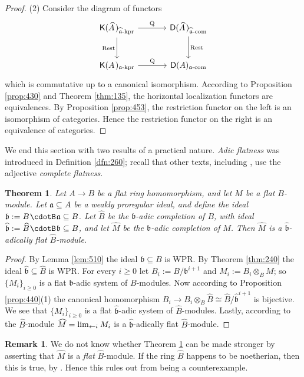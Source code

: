 \documentclass[10pt]{amsart}
\newtheorem{thm}[equation]{Theorem}
\theoremstyle{definition}
\newtheorem{rem}[equation]{Remark}
\numberwithin{equation}{section}
\newcommand{\lto}{\leftarrow}
\newcommand{\sub}{\subseteq}
\newcommand{\opn}{\operatorname}
\newcommand{\cat}[1]{\operatorname{\mathsf{#1}}}
\newcommand{\cd}{\mspace{1.3mu}{\cdotB}\mspace{1.3mu}}
\newcommand{\mfrak}[1]{\mathfrak{#1}}
\newcommand{\mrm}[1]{\mathrm{#1}}
\renewcommand{\a}{\mfrak{a}}
\renewcommand{\b}{\mfrak{b}}
\newcommand{\tup}[1]{\textrm{#1}}
\newcommand{\ot}{\otimes}
\newcommand{\what}[1]{\widehat{#1}}
\newcommand{\wh}[1]{\widehat{#1}}
\newcommand{\msp}[1]{\mspace{#1 mu}}
\begin{document}
\begin{proof}
\medskip \noindent
(2) Consider the diagram of functors
\[ \begin{tikzcd} [column sep = 8ex, row sep = 6ex]
\cat{K}(\what{A} \msp{2})_{\tup{$\what{\a}$-kpr}}
\ar[d, "{\opn{Rest}}"']
\ar[r, "{\mrm{Q}}"]
&
\cat{D}(\what{A} \msp{2})_{\tup{$\what{\a}$-com}}
\ar[d, "{\opn{Rest}}"]
\\
\cat{K}(A \msp{2})_{\tup{$\a$-kpr}}
\ar[r, "{\mrm{Q}}"]
&
\cat{D}(A)_{\tup{$\a$-com}}
\end{tikzcd} \]
which is commutative up to a canonical isomorphism.
According to Proposition \ref{prop:430} and Theorem \ref{thm:135}, the
horizontal localization functors are equivalences. By Proposition
\ref{prop:453}, the restriction functor on the left is an isomorphism of
categories. Hence the restriction functor on the right is an equivalence of
categories.
\end{proof}

We end this section with two results of a practical nature.
{\em Adic flatness} was introduced in Definition \ref{dfn:260}; recall
that other texts, including \cite{BS}, use the adjective {\em complete
flatness}.

\begin{thm} \label{thm:510}
Let $A \to B$ be a flat ring homomorphism, and let $M$ be a flat $B$-module.
Let $\a \sub A$ be a weakly proregular ideal, and define the ideal
$\b := B \cd \a \sub B$. Let $\wh{B}$ be the $\b$-adic completion of $B$, with
ideal $\wh{\b} := \wh{B} \cd \b \sub B$, and let
$\wh{M}$ be the $\b$-adic completion of $M$.
Then $\wh{M}$ is a $\wh{\b}$-adically flat $\wh{B}$-module.
\end{thm}

\begin{proof}
By Lemma \ref{lem:510} the ideal $\b \sub B$ is WPR. By Theorem \ref{thm:240}
the ideal $\wh{\b} \sub \wh{B}$ is WPR.
For every $i \geq 0$ let
$B_i := B / \b^{i + 1}$ and $M_i := B_i \ot_B M$; so
$\{ M_i \}_{i \geq 0}$ is a flat $\b$-adic system of $B$-modules.
Now according to Proposition \ref{prop:440}(1) the canonical homomorphism
$B_i \to B_i \ot_B \wh{B} \cong \wh{B} / \wh{\b}^{i + 1}$ is bijective.
We see that $\{ M_i \}_{i \geq 0}$ is a flat $\wh{\b}$-adic system of
$\wh{B}$-modules.
Lastly, according to \cite[Theorem 6.9]{Ye4} the $\wh{B}$-module
$\wh{M} = \lim_{\lto i} \msp{1} M_i$ is
a $\wh{\b}$-adically flat $\wh{B}$-module.
\end{proof}


\begin{rem} \label{rem:510}
We do not know whether Theorem \ref{thm:510} can be made stronger  by
asserting that $\wh{M}$ is a {\em flat} $\wh{B}$-module.
If the ring $\wh{B}$ happens to be noetherian, then this is true, by
\cite[Theorem 1.5]{Ye4}. Hence this rules out
\cite[Theorem 7.2]{Ye4} from being a counterexample.
\end{rem}
\end{document}
